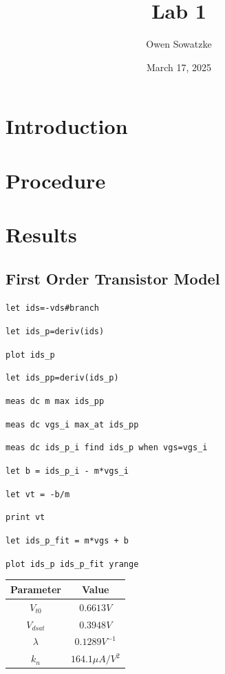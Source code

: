 \documentclass[fleqn]{article}
\title{Lab 1}
\author{Owen Sowatzke}
\date{March 17, 2025}
\newcommand{\zerodisplayskip}{
	\setlength{\abovedisplayskip}{0pt}%
	\setlength{\belowdisplayskip}{0pt}%
	\setlength{\abovedisplayshortskip}{0pt}%
	\setlength{\belowdisplayshortskip}{0pt}%
	\setlength{\mathindent}{0pt}}
\begin{document}
	\maketitle
	
	\section{Introduction}
	
	\section{Procedure}
	
	\section{Results}
	
	\subsection{First Order Transistor Model}
	
	\texttt{let ids=-vds\#branch}
	
	\texttt{let ids\_p=deriv(ids)}
	
	\texttt{plot ids\_p}
	
	\texttt{let ids\_pp=deriv(ids\_p)}
	
	\texttt{meas dc m max ids\_pp}
	
	\texttt{meas dc vgs\_i max\_at ids\_pp}
	
	\texttt{meas dc ids\_p\_i find ids\_p when vgs=vgs\_i}
	
	\texttt{let b = ids\_p\_i - m*vgs\_i}
	
	\texttt{let vt = -b/m}
	
	\texttt{print vt}
	
	\texttt{let ids\_p\_fit = m*vgs + b}
	
	\texttt{plot ids\_p ids\_p\_fit yrange}
	
	\begin{center}
	\label{table::nmos_params}
	\begin{tabular}{| c | c |}
		\hline
		Parameter & Value \\
		\hline	
		$V_{t0}$ & $0.6613 V$\\
		\hline	
		$V_{dsat}$ & $0.3948 V$\\
		\hline	
		$\lambda$ & $0.1289 V^{-1}$\\
		\hline			
		$k_n$ & $164.1 {\mu}A/V^2$ \\
		\hline
	\end{tabular}
	\end{center}
	
\end{document}
